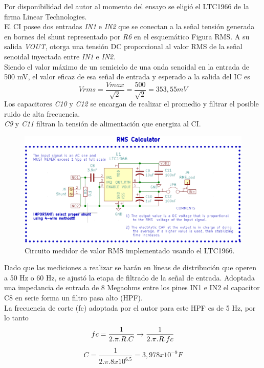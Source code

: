 Por disponibilidad del autor al momento del ensayo se eligió el LTC1966 de la firma Linear Technologies.\\
El CI posee dos entradas \textit{IN1} e \textit{IN2} que se conectan a la señal tensión generada en bornes del shunt representado por \textit{R6} en el esquemático Figura RMS. A su salida \textit{VOUT}, otorga una tensión DC proporcional al valor RMS de la señal senoidal inyectada entre \textit{IN1} e \textit{IN2}.\\
Siendo el valor máximo de un semiciclo de una onda senoidal en la entrada de 500 mV, el valor eficaz de esa señal de entrada y esperado a la salida del IC es
\begin{equation}
	Vrms=\frac{Vmax}{\sqrt{2}}=\frac{500}{\sqrt{2}}= 353,55 mV
\end{equation}
Los capacitores \textit{C10} y \textit{C12} se encargan de realizar el promedio y filtrar el posible ruido de alta frecuencia.\\
\textit{C9} y \textit{C11} filtran la tensión de alimentación que energiza al CI.\\
\begin{figure}[h!]
	\centering
	\includegraphics[width=0.7\linewidth]{Figures/cto_medidor_rms}
	\caption{Circuito medidor de valor RMS implementado usando el LTC1966.}
	\label{fig:ctomedidorrms}
\end{figure}
Dado que las mediciones a realizar se harán en líneas de distribución que operen a 50 Hz o 60 Hz, se ajustó la etapa de filtrado de la señal de entrada. Adoptada una impedancia de entrada de 8 Megaohms entre los pines IN1 e IN2 el capacitor C8 en serie forma un filtro pasa alto (HPF).\\
La frecuencia de corte (fc) adoptada por el autor para este HPF es de 5 Hz, por lo tanto
\begin{equation}
	fc = \frac{1}{2.\pi.R.C}\rightarrow\frac{1}{2.\pi.R.fc}\\
\end{equation}
\begin{equation}
	C=\frac{1}{2.\pi.8x10^6.5}=3,978x10^{-9} F
\end{equation}
